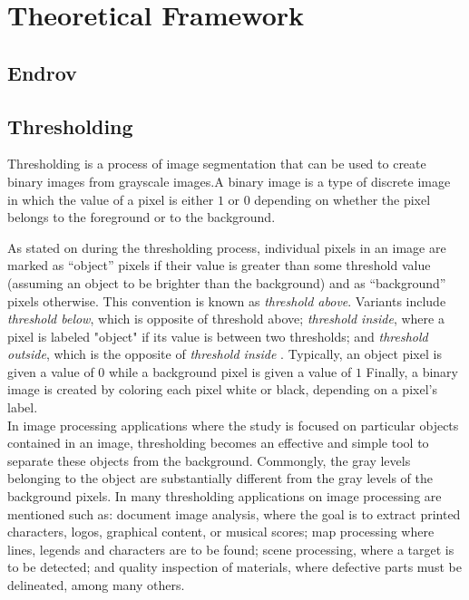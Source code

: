 \cleardoublepage
\chapter{Theoretical Framework}
\label{sec:dev}

\section{Endrov}
\label{sec:endrov}



\section{Thresholding}
\label{sec:thresholding}

Thresholding is a process of image segmentation that can be used to create
binary images from grayscale images.A binary image is a type of discrete image in
 which the value of a pixel is either $1$ or $0$ depending on whether the pixel belongs
to the foreground or to the background.

As stated on \cite{web:thresholding} during the thresholding process, individual 
pixels in an image are marked as ``object'' pixels if 
their value is greater than some threshold value (assuming an object to be brighter than the 
background) and as ``background'' pixels otherwise. This convention is known as \emph{threshold above}. 
Variants include \emph{threshold below}, which is opposite of threshold above; \emph{threshold inside}, where a 
pixel is labeled "object" if its value is between two thresholds; and \emph{threshold outside}, which is 
the opposite of \emph{threshold inside} \cite{shapiro}. Typically, an object pixel is given 
a value of $0$ while a background pixel is given a value of $1$ Finally, a binary image is 
created by coloring each pixel white or black, depending on a pixel's label.\\

In image processing applications where the study is focused on particular objects contained
in an image, thresholding becomes an effective and simple tool to separate these objects from
the background. Commongly, the gray levels belonging to the object are substantially
different from the gray levels of the background pixels. In \cite[p.146]{thres} many thresholding
applications on image processing are mentioned such as: document image analysis, where the goal
is to extract printed characters, logos, graphical content, or musical scores; map processing
where lines, legends and characters are to be found; scene processing, where a target is to
be detected; and quality inspection of materials, where defective parts must be delineated,
among many others. \\

